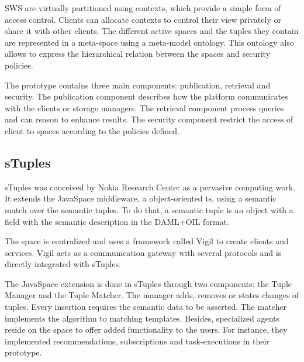 SWS are virtually partitioned using contexts, which provide a simple form of access control.
Clients can allocate contexts to control their view privately or share it with other clients. %
The different active spaces and the tuples they contain are represented in a meta-space using a meta-model ontology.
This ontology also allows to express the hierarchical relation between the spaces and security policies.

The prototype contains three main components: publication, retrieval and security.
The publication component describes how the platform communicates with the clients or storage managers.
The retrieval component process queries and can reason to enhance results. %
The security component restrict the access of client to spaces according to the policies defined.  %



\subsection{sTuples}

sTuples \cite{khushraj_stuples:_2004} was conceived by Nokia Research Center as a pervasive computing work.
It extends the JavaSpace middleware, a object-oriented \acl{ts}, using a semantic match over the semantic tuples.
To do that, a semantic tuple is an object with a field with the semantic description in the DAML+OIL format. %


The space is centralized and uses a framework called Vigil to create clients and services. %
Vigil acts as a communication gateway with several protocols and is directly integrated with sTuples.


The JavaSpace extension is done in sTuples through two components: the Tuple Manager and the Tuple Matcher.
The manager adds, removes or states changes of tuples.
Every insertion requires the semantic data to be asserted.
The matcher implements the algorithm to matching templates.
Besides, specialized agents reside on the space to offer added functionality to the users.
For instance, they implemented recommendations, subscriptions and task-executions in their prototype.



